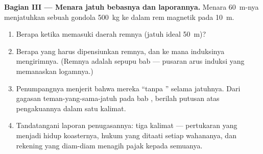 \begin{problem}
\medskip\noindent\textbf{Bagian III --- Menara jatuh bebasnya
dan laporannya.}
Menara \qty{60}{m}-nya menjatuhkan sebuah gondola \qty{500}{kg} ke
dalam rem magnetik pada \qty{10}{m}.
\begin{enumerate}[resume]
  \item Berapa  ketika memasuki daerah remnya (jatuh ideal
        \qty{50}{m})?
  \item Berapa  yang harus dipensiunkan remnya, dan ke mana
        induksinya mengirimnya. (Remnya adalah sepupu bab
         --- pusaran arus induksi yang memanaskan
        logamnya.)
  \item Penumpangnya menjerit bahwa mereka ``tanpa '' selama
        jatuhnya. Dari gagasan teman-yang-sama-jatuh pada bab
        , berilah putusan atas pengakuannya dalam satu
        kalimat.
  \item Tandatangani laporan penugasannya: tiga kalimat ---
        pertukaran yang menjadi hidup koasternya, hukum yang ditaati
        setiap wahananya, dan rekening yang diam-diam menagih pajak
        kepada semuanya.
\end{enumerate}
\end{problem}
